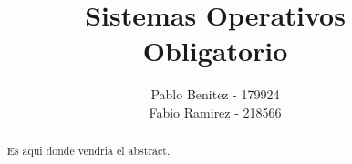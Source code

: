 
\title{Sistemas Operativos\\Obligatorio}
\author{Pablo Benitez - 179924\\Fabio Ramirez - 218566}
\usepackage{hyperref}
\usepackage{float}



\nocite{*}



\maketitle


\begin{abstract}
    Es aqui donde vendria el abstract.
    
\end{abstract}

\tableofcontents



